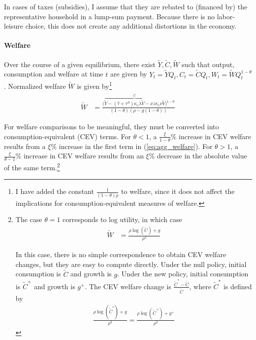 \documentclass[11pt,english]{article}
\theoremstyle{remark}
\begin{document}
In cases of taxes (subsidies), I assume that they are rebated to (financed by) the representative household in a lump-sum payment. Because there is no labor-leisure choice, this does not create any additional distortions in the economy. 

\paragraph{Welfare}

Over the course of a given equilibrium, there exist $\tilde{Y},\tilde{C},\tilde{W}$ such that output, consumption and welfare at time $t$ are given by $Y_t = \tilde{Y} Q_t, C_t = \tilde{C} Q_t, W_t = \tilde{W} Q_t^{1-\theta}$. Normalized welfare $\tilde{W}$ is given by\footnote{I have added the constant $\frac{1}{(1-\theta)\rho}$ to welfare, since it does not affect the implications for consumption-equivalent measures of welfare.}
\begin{align}
\tilde{W} &= \frac{\big(\overbrace{\tilde{Y} - (\hat{\tau} + \tau^S) \kappa_{e} \lambda \tilde{V} - x z \kappa_c \nu \tilde{V}}^{\tilde{C}}\big)^{1-\theta}}{(1-\theta)(\rho - g(1-\theta))} \label{eq:agg_welfare}
\end{align}


For welfare comparisons to be meaningful, they must be converted into consumption-equivalent (CEV) terms. For $\theta < 1$, a $\frac{\xi}{1-\theta}\%$ increase in CEV welfare results from a $\xi\%$ increase in the first term in (\ref{eq:agg_welfare}). For $\theta > 1$, a $\frac{\xi}{\theta-1}\%$ increase in CEV welfare results from an $\xi\%$ decrease in the absolute value of the same term.\footnote{The case $\theta = 1$ corresponds to log utility, in which case
	\begin{align}
	\tilde{W} &= \frac{\rho \log(\tilde{C}) + g}{\rho^2} \label{eq:agg_welfare_log}
	\end{align}
	
	In this case, there is no simple correspondence to obtain CEV welfare changes, but they are easy to compute directly. Under the null policy, initial consumption is $\tilde{C}$ and growth is $g$. Under the new policy, initial consumption is $\tilde{C}^+$ and growth is $g^+$. The CEV welfare change is $\frac{\tilde{C}^* - \tilde{C}}{\tilde{C}}$, where $\tilde{C}^*$ is defined by 
	\begin{align}
	\frac{\rho\log(\tilde{C}^*) + g}{\rho^2} = \frac{\rho \log(\tilde{C}^+) + g^+}{\rho^2} \label{eq:agg_welfare_log_CEV}
	\end{align}}
\end{document}
